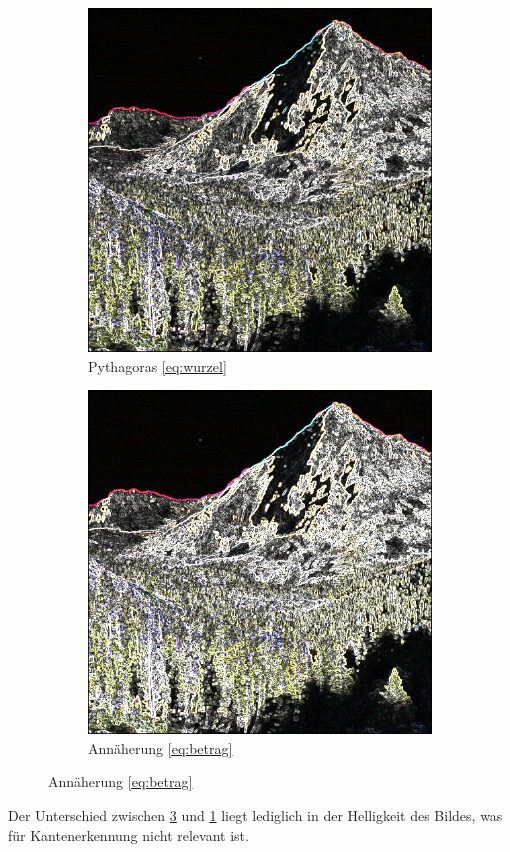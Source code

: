 \documentclass[course=erap]{aspdoc}
\begin{document}
\begin{figure}[H]
    \begin{subfigure}{.5\columnwidth}
        \centering
        \includegraphics[width=\columnwidth]{graphics/sqrt_sobel.png}
        \caption{Pythagoras \ref{eq:wurzel}}
        \label{fig:sqrt-bild}
    \end{subfigure}
    \begin{subfigure}{.5\columnwidth}
        \centering
        \includegraphics[width=\columnwidth]{graphics/johnmuirtrail_sobel.png}
        \caption{Annäherung \ref{eq:betrag}}
        \label{fig:abs-bild}
    \end{subfigure}
\end{figure}
Der Unterschied zwischen \ref{fig:abs-bild} und \ref{fig:sqrt-bild} liegt lediglich in der Helligkeit des Bildes, was für Kantenerkennung nicht relevant ist.
\end{document}
